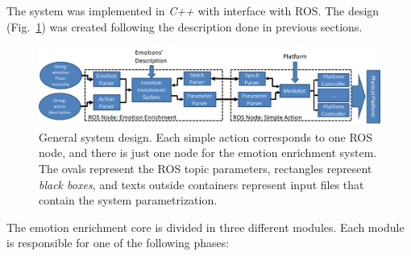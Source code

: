 The system was implemented in \textit{C++} with interface with ROS. The design (Fig.~\ref{fig:system_architecture}) was created following the description done in previous sections. 
\begin{figure}
	\centering
	\includegraphics[width=1.0\textwidth]{Images/SystemArchitecture.png} 	
	\caption{General system design. Each simple action corresponds to one ROS node, and there is just one node for the emotion enrichment system. The ovals represent the ROS topic parameters, rectangles represent \textit{black boxes}, and texts outside containers represent input files that contain the system parametrization.}
	\label{fig:system_architecture}
\end{figure}
The emotion enrichment core is divided in three different modules. 
Each module is responsible for one of the following phases:
